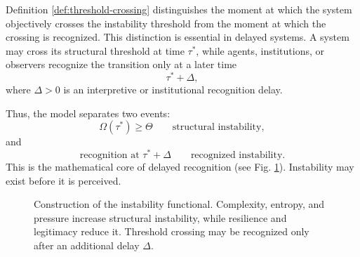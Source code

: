 \documentclass[11pt]{article}
\begin{document}
Definition \ref{def:threshold-crossing} distinguishes the moment at which the system objectively crosses the instability threshold from the moment at which the crossing is recognized. This distinction is essential in delayed systems. A system may cross its structural threshold at time $\tau^\ast$, while agents, institutions, or observers recognize the transition only at a later time
\[
\tau^\ast+\Delta,
\]
where $\Delta>0$ is an interpretive or institutional recognition delay.

Thus, the model separates two events:
\[
\Omega(\tau^\ast)\geq \Theta
\qquad
\text{structural instability},
\]
and
\[
\text{recognition at } \tau^\ast+\Delta
\qquad
\text{recognized instability}.
\]
This is the mathematical core of delayed recognition (see Fig. \ref{fig:omega-functional}). Instability may exist before it is perceived.

\begin{figure}[htbp]
	\centering
	\caption{Construction of the instability functional. Complexity, entropy, and pressure increase structural instability, while resilience and legitimacy reduce it. Threshold crossing may be recognized only after an additional delay $\Delta$.}
	\label{fig:omega-functional}
\end{figure} 
\end{document}
